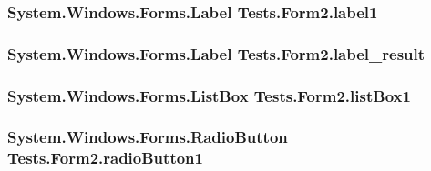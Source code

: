 \subsubsection[{\texorpdfstring{label1}{label1}}]{\setlength{\rightskip}{0pt plus 5cm}System.\+Windows.\+Forms.\+Label Tests.\+Form2.\+label1\hspace{0.3cm}{\ttfamily [private]}}\hypertarget{class_tests_1_1_form2_ad3b2b91e0f3feba4590909a3a7a183b6}{}\label{class_tests_1_1_form2_ad3b2b91e0f3feba4590909a3a7a183b6}
\subsubsection[{\texorpdfstring{label\+\_\+result}{label_result}}]{\setlength{\rightskip}{0pt plus 5cm}System.\+Windows.\+Forms.\+Label Tests.\+Form2.\+label\+\_\+result\hspace{0.3cm}{\ttfamily [private]}}\hypertarget{class_tests_1_1_form2_a8b4c39a636e8f658d2863be6160fc0ec}{}\label{class_tests_1_1_form2_a8b4c39a636e8f658d2863be6160fc0ec}
\subsubsection[{\texorpdfstring{list\+Box1}{listBox1}}]{\setlength{\rightskip}{0pt plus 5cm}System.\+Windows.\+Forms.\+List\+Box Tests.\+Form2.\+list\+Box1\hspace{0.3cm}{\ttfamily [private]}}\hypertarget{class_tests_1_1_form2_a480f63340ce06b249c91e40b327e4ccb}{}\label{class_tests_1_1_form2_a480f63340ce06b249c91e40b327e4ccb}
\subsubsection[{\texorpdfstring{radio\+Button1}{radioButton1}}]{\setlength{\rightskip}{0pt plus 5cm}System.\+Windows.\+Forms.\+Radio\+Button Tests.\+Form2.\+radio\+Button1\hspace{0.3cm}{\ttfamily [private]}}\hypertarget{class_tests_1_1_form2_ad4990affbee8ba8accb2b5aee47fdbca}{}\label{class_tests_1_1_form2_ad4990affbee8ba8accb2b5aee47fdbca}
